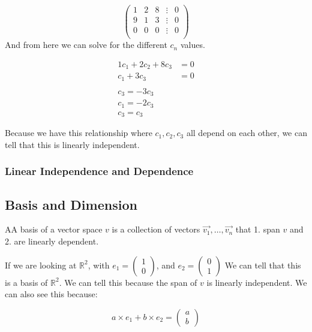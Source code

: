 \begin{problem}
    \begin{equation}
      \begin{pmatrix}
        1&2&8&\vdots&0\\
        9&1&3&\vdots&0\\
        0&0&0&\vdots&0\\
      \end{pmatrix}
    \end{equation}
    And from here we can solve for the different $c_n$ values.

    \begin{align}
      1c_1+2c_2+8c_3&=0\\
      c_1+3c_3&=0\\\\
      c_3=-3c_3\\
      c_1=-2c_3\\
      c_3=c_3  
    \end{align}

    Because we have this relationship where $c_1,c_2,c_3$ all depend on each other, we can tell that this is linearly independent.
  \end{problem}

  \subsubsection{Linear Independence and Dependence}
  
\subsection{Basis and Dimension}
  \begin{definition}
    AA basis of a vector space $v$ is a collection of vectors $\vec{v_1},\dots,\vec{v_n}$ that 1. span $v$ and 2. are linearly dependent.
  \end{definition}

  \begin{problem}
    If we are looking at $\mathbb{R}^2$, with $e_1=\left(\begin{smallmatrix}1\\0\end{smallmatrix}\right)$, and $e_2=\left(\begin{smallmatrix}0\\1\end{smallmatrix}\right)$
    We can tell that this is a basis of $\mathbb{R}^2$. We can tell this because the span of $v$ is linearly independent. We can also see this because:

    \begin{equation}
      a\times e_1+b\times e_2=\begin{pmatrix}a\\b\end{pmatrix}
    \end{equation}
  \end{problem}

